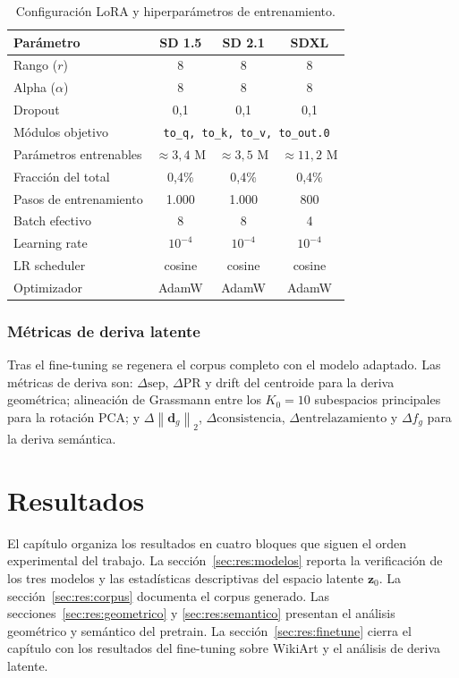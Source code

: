 \documentclass[12pt, a4paper, twoside]{book}
\newcommand{\z}{\mathbf{z}}
\newcommand{\norm}[1]{\left\|#1\right\|_2}
\begin{document}
\begin{table}[htb]
\centering
\caption{Configuración LoRA y hiperparámetros de entrenamiento.}
\label{tab:lora}
\small
\begin{tabular}{lccc}
\toprule
\textbf{Parámetro} & \textbf{SD 1.5} & \textbf{SD 2.1} & \textbf{SDXL} \\
\midrule
Rango ($r$) & 8 & 8 & 8 \\
Alpha ($\alpha$) & 8 & 8 & 8 \\
Dropout & 0,1 & 0,1 & 0,1 \\
Módulos objetivo & \multicolumn{3}{c}{\texttt{to\_q, to\_k, to\_v, to\_out.0}} \\
Parámetros entrenables & $\approx 3{,}4$ M & $\approx 3{,}5$ M & $\approx 11{,}2$ M \\
Fracción del total & 0,4\% & 0,4\% & 0,4\% \\
Pasos de entrenamiento & 1.000 & 1.000 & 800 \\
Batch efectivo & 8 & 8 & 4 \\
Learning rate & $10^{-4}$ & $10^{-4}$ & $10^{-4}$ \\
LR scheduler & cosine & cosine & cosine \\
Optimizador & AdamW & AdamW & AdamW \\
\bottomrule
\end{tabular}
\end{table}

\subsection{Métricas de deriva latente}

Tras el fine-tuning se regenera el corpus completo con el modelo adaptado. Las métricas de deriva son: $\Delta\text{sep}$, $\Delta\text{PR}$ y drift del centroide para la deriva geométrica; alineación de Grassmann entre los $K_0 = 10$ subespacios principales para la rotación PCA; y $\Delta\norm{\mathbf{d}_g}$, $\Delta\text{consistencia}$, $\Delta\text{entrelazamiento}$ y $\Delta f_g$ para la deriva semántica.

\chapter{Resultados}
\label{ch:resultados}

El capítulo organiza los resultados en cuatro bloques que siguen el orden experimental del trabajo.
La sección~\ref{sec:res:modelos} reporta la verificación de los tres modelos y las estadísticas
descriptivas del espacio latente $\z_0$. La sección~\ref{sec:res:corpus} documenta el corpus
generado. Las secciones~\ref{sec:res:geometrico} y \ref{sec:res:semantico} presentan el análisis
geométrico y semántico del pretrain. La sección~\ref{sec:res:finetune} cierra el capítulo con los
resultados del fine-tuning sobre WikiArt y el análisis de deriva latente.
\end{document}

